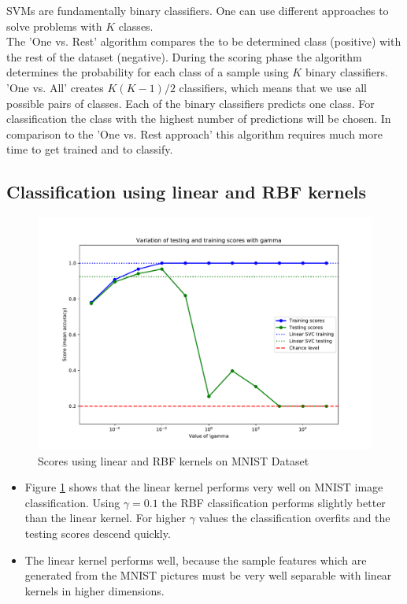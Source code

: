 \documentclass{article}
\begin{document}
SVMs are fundamentally binary classifiers. One can use different approaches to solve problems with $K$ classes. \\
The 'One vs. Rest' algorithm compares the to be determined class (positive) with the rest of the dataset (negative). During the scoring phase the algorithm determines the probability for each class of a sample using $K$ binary classifiers.\\
'One vs. All' creates $K(K-1)/2$ classifiers, which means that we use all possible pairs of classes. Each of the binary classifiers predicts one class. For classification the class with the highest number of predictions will be chosen. In comparison to the 'One vs. Rest approach' this algorithm requires much more time to get trained and to classify.

\newpage

\subsection{Classification using linear and RBF kernels}

\begin{figure}[!ht]
	\centering
	\includegraphics[width=.8\textwidth]{./Figures/3a_score.pdf}
	\caption{Scores using linear and RBF kernels on MNIST Dataset}
	\label{multiclass_classification}
\end{figure}

\begin{itemize}

	\item Figure \ref{multiclass_classification} shows that the linear kernel performs very well on MNIST image classification. Using $\gamma = 0.1$ the RBF classification performs slightly better than the linear kernel. For higher $\gamma$ values the classification overfits and the testing scores descend quickly.
	
	\item The linear kernel performs well, because the sample features which are generated from the MNIST pictures must be very well separable with linear kernels in higher dimensions. 

\end{itemize}
\end{document}
